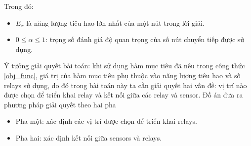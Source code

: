 Trong đó:
\begin{itemize}
    \item $E_x$ là năng lượng tiêu  hao lớn nhất của một nút trong lời giải. 
    \item $0 \leq \alpha \leq 1$: trọng số đánh giá độ quan trọng của số nút chuyển tiếp được sử dụng.
\end{itemize}

Ý tưởng giải quyết bài toán: khi sử dụng hàm mục tiêu đã nêu trong công thức \ref{obj_func}, giá trị của hàm mục tiêu phụ thuộc vào năng lượng tiêu hao và số relays sử dụng, do đó trong bài toán này ta cần giải quyết hai vấn đề: vị trí nào được chọn để triển khai relay và kết nối giữa các relay và sensor. Đồ án đưa ra phương pháp giải quyết theo hai pha
\begin{itemize}
    \item Pha một: xác định các vị trí được chọn để triển khai relays.  
    \item Pha hai: xác định kết nối giữa sensors và relays. 
\end{itemize}